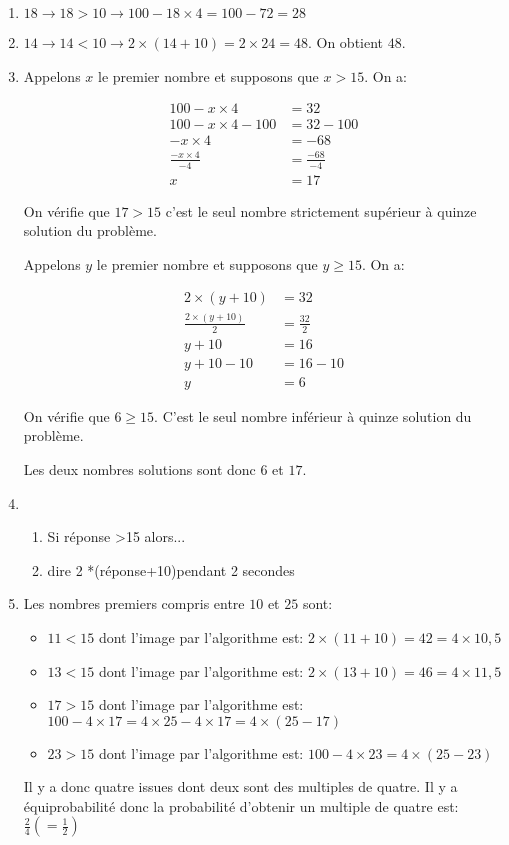 
\begin{enumerate}
\item $18\longrightarrow 18>10\longrightarrow 100-18 \times 4=100-72=28$
\item $14\longrightarrow 14<10\longrightarrow 2 \times (14+10)=2 \times 24=48$. On obtient $48$.
\item \begin{multicols}{2}
Appelons $x$ le premier nombre et supposons que $x>15$. On a:

\begin{align*}
100-x \times 4&=32\\
100-x \times 4-100&=32-100\\
-x \times 4 &=-68\\
\frac{-x \times 4}{-4} &=\frac{-68}{-4}\\
x &=17
\end{align*}

On vérifie que $17>15$ c'est le seul nombre strictement supérieur à quinze solution du problème.
\columnbreak

Appelons $y$ le premier nombre et supposons que $y\geq15$. On a:

\begin{align*}
2 \times (y+10)&=32\\
\frac{2 \times (y+10)}{2}&=\frac{32}{2}\\
y+10 &=16\\
y+10-10&=16-10\\
y&=6
\end{align*}

On vérifie que $6\geq 15$. C'est le seul nombre inférieur à quinze solution du problème.
\end{multicols}

Les deux nombres solutions sont donc $6$ et $17$.
\item 
\begin{enumerate}

\item Si réponse >15 alors...
\item dire 2 *(réponse+10)pendant 2 secondes
\end{enumerate}
\item Les nombres premiers compris entre $10$ et $25$ sont:
\begin{itemize}[label=$\bullet$]
\item $11<15$ dont l'image par l'algorithme est: $2 \times (11+10)=42=4 \times 10,5$
\item $13<15$ dont l'image par l'algorithme est: $2 \times (13+10)=46=4 \times 11,5$
\item $17>15$ dont l'image par l'algorithme est: $100-4 \times 17=4 \times 25-4 \times 17=4 \times (25-17)$
\item $23>15$ dont l'image par l'algorithme est: $100-4 \times 23=4 \times (25-23)$
\end{itemize}

Il y a donc quatre issues dont deux sont des multiples de quatre.  Il y a équiprobabilité donc la probabilité d'obtenir un multiple de quatre est: $\frac{2}{4}\left(=\frac{1}{2}\right)$
\end{enumerate}

